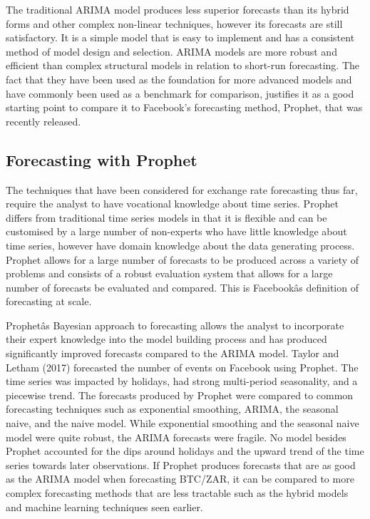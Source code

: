 \documentclass[12pt,a4paper]{article}
\numberwithin{equation}{section}
\numberwithin{figure}{section}
\numberwithin{table}{section}
\begin{document}
The traditional ARIMA model produces less superior forecasts than its
hybrid forms and other complex non-linear techniques, however its
forecasts are still satisfactory. It is a simple model that is easy to
implement and has a consistent method of model design and selection.
ARIMA models are more robust and efficient than complex structural
models in relation to short-run forecasting. The fact that they have
been used as the foundation for more advanced models and have commonly
been used as a benchmark for comparison, justifies it as a good starting
point to compare it to Facebook's forecasting method, Prophet, that was
recently released.

\subsection{Forecasting with Prophet}\label{forecasting-with-prophet}

The techniques that have been considered for exchange rate forecasting
thus far, require the analyst to have vocational knowledge about time
series. Prophet differs from traditional time series models in that it
is flexible and can be customised by a large number of non-experts who
have little knowledge about time series, however have domain knowledge
about the data generating process. Prophet allows for a large number of
forecasts to be produced across a variety of problems and consists of a
robust evaluation system that allows for a large number of forecasts be
evaluated and compared. This is Facebookâs definition of forecasting
at scale.

Prophetâs Bayesian approach to forecasting allows the analyst to
incorporate their expert knowledge into the model building process and
has produced significantly improved forecasts compared to the ARIMA
model. Taylor and Letham (2017) forecasted the number of events on
Facebook using Prophet. The time series was impacted by holidays, had
strong multi-period seasonality, and a piecewise trend. The forecasts
produced by Prophet were compared to common forecasting techniques such
as exponential smoothing, ARIMA, the seasonal naive, and the naive
model. While exponential smoothing and the seasonal naive model were
quite robust, the ARIMA forecasts were fragile. No model besides Prophet
accounted for the dips around holidays and the upward trend of the time
series towards later observations. If Prophet produces forecasts that
are as good as the ARIMA model when forecasting BTC/ZAR, it can be
compared to more complex forecasting methods that are less tractable
such as the hybrid models and machine learning techniques seen earlier.
\end{document}
